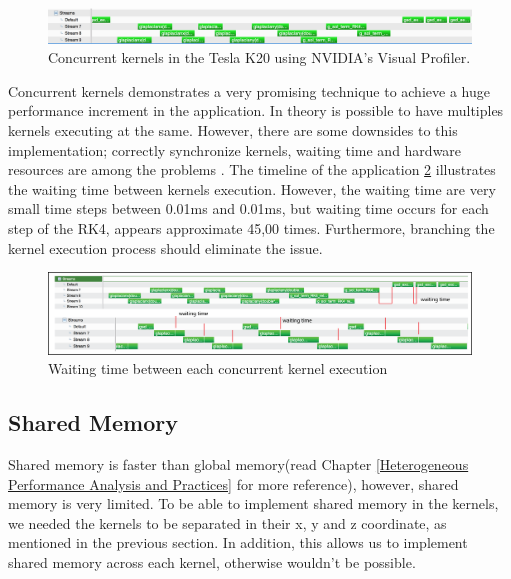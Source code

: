 \begin{figure}[htbp]
	\centering
		\includegraphics[width=1.0\textwidth]{Figures/concurent.png}
		\smallskip
	\caption[Streams kernels Tesla K20]{Concurrent kernels in the Tesla K20 using NVIDIA's Visual Profiler.}
	\label{fig:concurrent}
\end{figure}

Concurrent kernels demonstrates a very promising technique to achieve a huge performance increment in the application. In theory is possible to have multiples kernels executing at the same. However, there are some downsides to this implementation; correctly synchronize kernels, waiting time and hardware resources are among the  problems \cite{practices}. The timeline of the application \ref{fig:waittime} illustrates the waiting time between kernels execution. However, the waiting time are very small time steps between 0.01ms and 0.01ms, but waiting time occurs for each step of the RK4, appears approximate 45,00 times. Furthermore, branching the kernel execution process should eliminate the issue.

\begin{figure}[htbp]
	\centering
		\includegraphics[width=1.0\textwidth]{Figures/waittime.png}
		\smallskip
	\caption[Waiting time in concurrent kernels]{Waiting time between each concurrent kernel execution}
	\label{fig:waittime}
\end{figure}


\subsection{Shared Memory}

Shared memory is faster than global memory(read Chapter \ref{Heterogeneous Performance Analysis and Practices} for more reference), however, shared memory is very limited. To be able to implement shared memory in the kernels, we needed the kernels to be separated in their x, y and z coordinate, as mentioned in the previous section. In addition, this allows us to implement shared memory across each kernel, otherwise wouldn't be possible.


